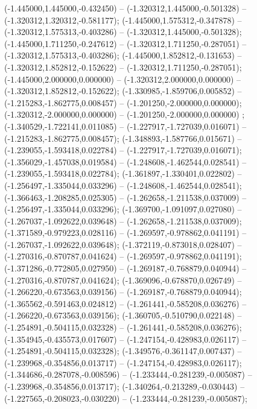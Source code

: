  (-1.445000,1.445000,-0.432450) -- (-1.320312,1.445000,-0.501328) -- (-1.320312,1.320312,-0.581177);
 (-1.445000,1.575312,-0.347878) -- (-1.320312,1.575313,-0.403286) -- (-1.320312,1.445000,-0.501328);
 (-1.445000,1.711250,-0.247612) -- (-1.320312,1.711250,-0.287051) -- (-1.320312,1.575313,-0.403286);
 (-1.445000,1.852812,-0.131653) -- (-1.320312,1.852812,-0.152622) -- (-1.320312,1.711250,-0.287051);
 (-1.445000,2.000000,0.000000) -- (-1.320312,2.000000,0.000000) -- (-1.320312,1.852812,-0.152622);
 (-1.330985,-1.859706,0.005852) -- (-1.215283,-1.862775,0.008457) -- (-1.201250,-2.000000,0.000000);
 (-1.320312,-2.000000,0.000000) -- (-1.201250,-2.000000,0.000000) ;
 (-1.340529,-1.722141,0.011085) -- (-1.227917,-1.727039,0.016071) -- (-1.215283,-1.862775,0.008457);
 (-1.348893,-1.587766,0.015671) -- (-1.239055,-1.593418,0.022784) -- (-1.227917,-1.727039,0.016071);
 (-1.356029,-1.457038,0.019584) -- (-1.248608,-1.462544,0.028541) -- (-1.239055,-1.593418,0.022784);
 (-1.361897,-1.330401,0.022802) -- (-1.256497,-1.335044,0.033296) -- (-1.248608,-1.462544,0.028541);
 (-1.366463,-1.208285,0.025305) -- (-1.262658,-1.211538,0.037009) -- (-1.256497,-1.335044,0.033296);
 (-1.369700,-1.091097,0.027080) -- (-1.267037,-1.092622,0.039648) -- (-1.262658,-1.211538,0.037009);
 (-1.371589,-0.979223,0.028116) -- (-1.269597,-0.978862,0.041191) -- (-1.267037,-1.092622,0.039648);
 (-1.372119,-0.873018,0.028407) -- (-1.270316,-0.870787,0.041624) -- (-1.269597,-0.978862,0.041191);
 (-1.371286,-0.772805,0.027950) -- (-1.269187,-0.768879,0.040944) -- (-1.270316,-0.870787,0.041624);
 (-1.369096,-0.678870,0.026749) -- (-1.266220,-0.673563,0.039156) -- (-1.269187,-0.768879,0.040944);
 (-1.365562,-0.591463,0.024812) -- (-1.261441,-0.585208,0.036276) -- (-1.266220,-0.673563,0.039156);
 (-1.360705,-0.510790,0.022148) -- (-1.254891,-0.504115,0.032328) -- (-1.261441,-0.585208,0.036276);
 (-1.354945,-0.435573,0.017607) -- (-1.247154,-0.428983,0.026117) -- (-1.254891,-0.504115,0.032328);
 (-1.349576,-0.361147,0.007437) -- (-1.239968,-0.354856,0.013717) -- (-1.247154,-0.428983,0.026117);
 (-1.344686,-0.287078,-0.008596) -- (-1.233444,-0.281239,-0.005087) -- (-1.239968,-0.354856,0.013717);
 (-1.340264,-0.213289,-0.030443) -- (-1.227565,-0.208023,-0.030220) -- (-1.233444,-0.281239,-0.005087);

